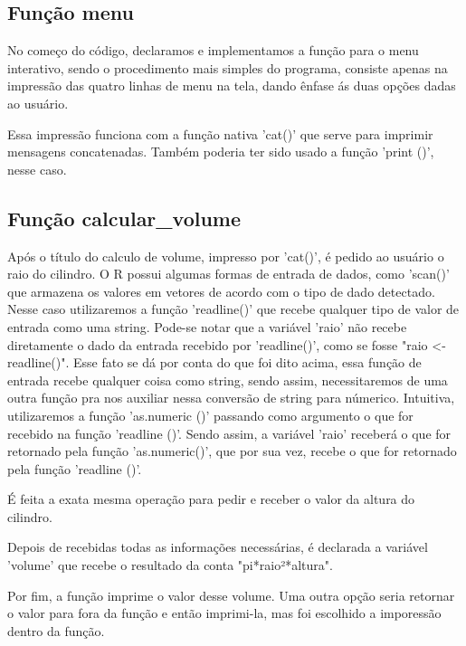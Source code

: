       \subsection{Função menu}
      No começo do código, declaramos e implementamos a função para o menu interativo, sendo o procedimento mais simples do programa, consiste apenas na impressão das quatro linhas de menu na tela, dando ênfase ás duas opções dadas ao usuário. \par Essa impressão funciona com a função nativa 'cat()' que serve para imprimir mensagens concatenadas. Também poderia ter sido usado a função 'print ()', nesse caso.
      \subsection{Função calcular\_volume}
      Após o título do calculo de volume, impresso por 'cat()', é pedido ao usuário o raio do cilindro. O R possui algumas formas de entrada de dados, como 'scan()' que armazena os valores em vetores de acordo com o tipo de dado detectado. Nesse caso utilizaremos a função 'readline()' que recebe qualquer tipo de valor de entrada como uma string. Pode-se notar que a variável 'raio' não recebe diretamente o dado da entrada recebido por 'readline()', como se fosse "raio <- readline()". Esse fato se dá por conta do que foi dito acima, essa função de entrada recebe qualquer coisa como string, sendo assim, necessitaremos de uma outra função pra nos auxiliar nessa conversão de string para númerico. Intuitiva, utilizaremos a função 'as.numeric ()' passando como argumento o que for recebido na função 'readline ()'. Sendo assim, a variável 'raio' receberá o que for retornado pela função 'as.numeric()', que por sua vez, recebe o que for retornado pela função 'readline ()'.\par É feita a exata mesma operação para pedir e receber o valor da altura do cilindro.\par Depois de recebidas todas as informações necessárias, é declarada a variável 'volume' que recebe o resultado da conta "pi*raio²*altura".\par Por fim, a função imprime o valor desse volume. Uma outra opção seria retornar o valor para fora da função e então imprimi-la, mas foi escolhido a imporessão dentro da função.
